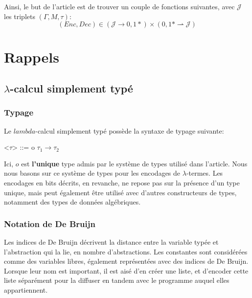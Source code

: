 \documentclass[titlepage]{article}
\begin{document}
Ainsi, le but de l'article est de trouver un couple de fonctions suivantes, avec \(\mathcal{J}\) les triplets \((\Gamma, M, \tau)\):
$$(Enc, Dec) \in (\mathcal{J} \rightarrow {0, 1}*) \times ({0, 1}* \rightharpoonup \mathcal{J})$$


\section{Rappels}\label{conventions-de-larticle}

\subsection{$\lambda$-calcul simplement typé}\label{lambda-calcul-simplement-typuxe9}

\subsubsection{Typage}\label{typage}

Le \(lambda\)-calcul simplement typé possède la syntaxe de typage suivante:

\begin{grammar}

\let\syntleft\relax
\let\syntright\relax

<$\tau$> ::= o
\alt $\tau_1 \rightarrow \tau_2$

\end{grammar}

Ici, \(o\) est \textbf{l'unique} type admis par le système de types
utilisé dans l'article. Nous nous basons sur ce système de types pour
les encodages de \(\lambda\)-termes. Les encodages en bits décrits, en
revanche, ne repose pas sur la présence d'un type unique, mais peut
également être utilisé avec d'autres constructeurs de types, notamment
des types de données algébriques.

\subsubsection{Notation de De Bruijn}\label{notation-de-de-bruijn}

Les indices de De Bruijn décrivent la distance entre la variable typée
et l'abstraction qui la lie, en nombre d'abstractions. Les constantes
sont considérées comme des variables libres, également représentées avec
des indices de De Bruijn. Lorsque leur nom est important, il est aisé
d'en créer une liste, et d'encoder cette liste séparément pour la
diffuser en tandem avec le programme auquel elles appartiennent.
\end{document}

